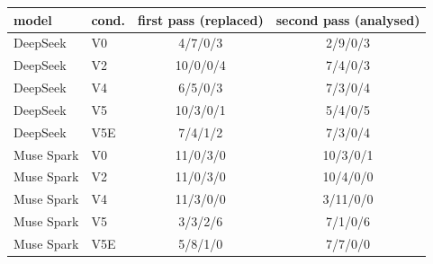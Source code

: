 \begin{tabular}{llcc}
\toprule
model & cond. & first pass (replaced) & second pass (analysed) \\
\midrule
DeepSeek & V0 & 4/7/0/3 & 2/9/0/3 \\
DeepSeek & V2 & 10/0/0/4 & 7/4/0/3 \\
DeepSeek & V4 & 6/5/0/3 & 7/3/0/4 \\
DeepSeek & V5 & 10/3/0/1 & 5/4/0/5 \\
DeepSeek & V5E & 7/4/1/2 & 7/3/0/4 \\
Muse Spark & V0 & 11/0/3/0 & 10/3/0/1 \\
Muse Spark & V2 & 11/0/3/0 & 10/4/0/0 \\
Muse Spark & V4 & 11/3/0/0 & 3/11/0/0 \\
Muse Spark & V5 & 3/3/2/6 & 7/1/0/6 \\
Muse Spark & V5E & 5/8/1/0 & 7/7/0/0 \\
\bottomrule
\end{tabular}
